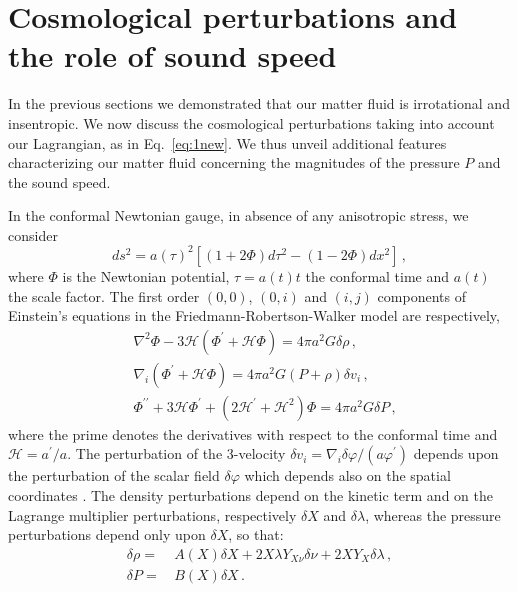 \documentclass[twocolumn,showpacs, nofootinbib,aps,superscriptaddress, eqsecnum,prd,prl,notitlepage,showkeys,10pt,reprint]{revtex4-1}
\begin{document}
\section{Cosmological perturbations and the role of sound speed}
\label{pert}

In the previous sections we demonstrated that our matter fluid is irrotational and insentropic. We now discuss the cosmological perturbations taking into account our Lagrangian, as in Eq.~\eqref{eq:1new}. We thus unveil additional features characterizing our matter fluid concerning the magnitudes of the pressure $P$ and  the sound speed.

In the conformal Newtonian gauge, in absence of any anisotropic stress, we consider \cite{1999PhLB..458..219G,Gao}
%
\begin{equation}
\label{pert1}
ds^2=a(\tau)^2\left[\left(1+2\Phi\right)d\tau^2-\left(1-2\Phi\right)dx^2\right]\,,
\end{equation}
%
where $\Phi$ is the Newtonian potential, $\tau=a(t)t$ the conformal time and $a(t)$ the scale factor.
The first order $\left(0,0\right)$, $\left(0,i\right)$ and $\left(i,j\right)$ components of Einstein's equations in the Friedmann-Robertson-Walker model are respectively,
%
\begin{align}
\label{pert2}
&\nabla^2\Phi-3\mathcal{H}\left(\Phi^\prime+\mathcal{H}\Phi\right)=4\pi a^2G\delta\rho\,,\\
\label{pert3}
&\nabla_i\left(\Phi^\prime+\mathcal{H}\Phi\right)=4\pi a^2G\left(P+\rho\right) \delta v_i\,,\\
\label{pert4}
&\Phi^{\prime\prime}+3\mathcal{H}\Phi^\prime+\left(2\mathcal{H}^\prime+\mathcal{H}^2\right)\Phi=4\pi a^2G\delta P\,,
\end{align}
%
where the prime denotes the derivatives with respect to the conformal time and $\mathcal{H}=a^\prime/a$. The perturbation of the 3-velocity $\delta v_i=\nabla_i\delta\varphi/(a\varphi^\prime)$ depends upon the perturbation of the scalar field $\delta\varphi$ which depends also on the spatial coordinates \cite{2014CQGra..31e5006P}. The density perturbations depend on the kinetic term and on the Lagrange multiplier perturbations, respectively $\delta X$ and $\delta\lambda$, whereas the pressure perturbations depend only upon $\delta X$, so that:
%
\begin{align}
\label{pert5}
\delta\rho=&\,A(X)\delta X+2X\lambda Y_{X\nu}\delta\nu+2XY_X\delta\lambda\,,\\
\label{pert6}
\delta P=&\,B(X)\delta X\,.
\end{align}
\end{document}
